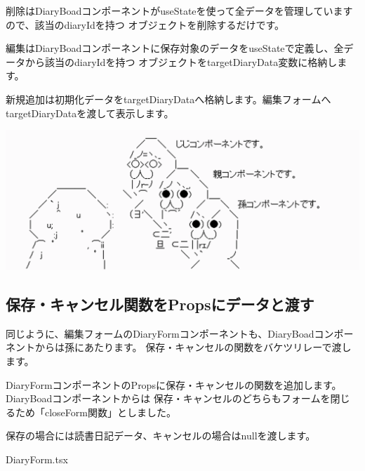 削除はDiaryBoadコンポーネントがuseStateを使って全データを管理していますので、該当のdiaryIdを持つ
オブジェクトを削除するだけです。

\vspace*{\baselineskip}

編集はDiaryBoadコンポーネントに保存対象のデータをuseStateで定義し、全データから該当のdiaryIdを持つ
オブジェクトをtargetDiaryData変数に格納します。

\vspace*{\baselineskip}

新規追加は初期化データをtargetDiaryDataへ格納します。編集フォームへtargetDiaryDataを渡して表示します。

\begin{reviewimage}[H]%
\includegraphics[width=0.8\maxwidth]{./images/03-todo-with-react/propsDrilling01.png}%
\label{image:03-todo-with-react:propsDrilling01}
\end{reviewimage}

\clearpage


\subsection{保存・キャンセル関数をPropsにデータと渡す}
\keeplastskip{
  \label{sec:3-4-2}
  \label{sec-034-2}
  \par\nobreak
}

同じように、編集フォームのDiaryFormコンポーネントも、DiaryBoadコンポーネントからは孫にあたります。
保存・キャンセルの関数をバケツリレーで渡します。

DiaryFormコンポーネントのPropsに保存・キャンセルの関数を追加します。DiaryBoadコンポーネントからは
保存・キャンセルのどちらもフォームを閉じるため「closeForm関数」としました。

\vspace*{\baselineskip}

保存の場合には読書日記データ、キャンセルの場合はnullを渡します。

\def\startercodeblockfontsize{}
\begin{starterprogram}[]{DiaryForm.tsx}\end{starterprogram}

